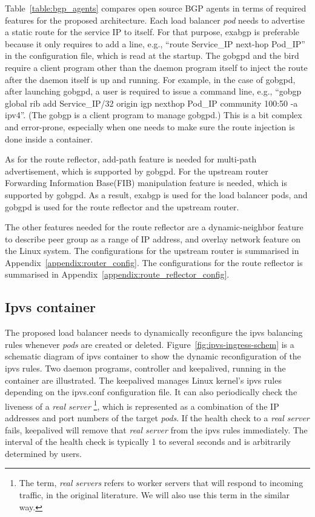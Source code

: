 Table~\ref{table:bgp_agents} compares open source BGP agents in terms of required features for the proposed architecture.
Each load balancer {\em pod} needs to advertise a static route for the service IP to itself. 
For that purpose, exabgp is preferable because it only requires to add a line, e.g., \enquote{route Service\_IP next-hop Pod\_IP} in the configuration file, which is read at the startup.
The gobgpd and the bird require a client program other than the daemon program itself to inject the route after the daemon itself is up and running.
For example, in the case of gobgpd, after launching gobgpd, a user is required to issue a command line, e.g., \enquote{gobgp global rib add Service\_IP/32 origin igp nexthop Pod\_IP community 100:50 -a ipv4}.
(The gobgp is a client program to manage gobgpd.)
This is a bit complex and error-prone, especially when one needs to make sure the route injection is done inside a container.

As for the route reflector, add-path\cite{rfc7911} feature is needed for multi-path advertisement, which is supported by gobgpd.
For the upstream router Forwarding Information Base(FIB) manipulation\cite{exa-networks_2018} feature is needed, which is supported by gobgpd.
As a result, exabgp is used for the load balancer pods, and gobgpd is used for the route reflector and the upstream router.

The other features needed for the route reflector are a dynamic-neighbor feature to describe peer group as a range of IP address, and overlay network feature on the Linux system.
The configurations for the upstream router is summarised in Appendix~\ref{appendix:router_config}.
The configurations for the route reflector is summarised in Appendix~\ref{appendix:route_reflector_config}.

\subsection{Ipvs container}\label{sec:ipvs}

The proposed load balancer needs to dynamically reconfigure the ipvs balancing rules whenever {\em pods} are created or deleted. 
Figure~\ref{fig:ipvs-ingress-schem} is a schematic diagram of ipvs container to show the dynamic reconfiguration of the ipvs rules.
Two daemon programs, controller and keepalived, running in the container are illustrated.
The keepalived manages Linux kernel's ipvs rules depending on the ipvs.conf configuration file.
It can also periodically check the liveness of a {\em real server}
\footnote{The term, {\em real servers} refers to worker servers that will respond to incoming traffic, 
in the original literature\cite{Zhang2000}. We will also use this term in the similar way.}, 
which is represented as a combination of the IP addresses and port numbers of the target {\em pods}. 
If the health check to a {\em real server} fails, keepalived will remove that {\em real server} from the ipvs rules immediately.
The interval of the health check is typically 1 to several seconds and is arbitrarily determined by users.  

